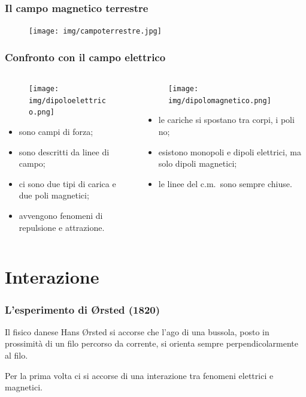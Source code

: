 \documentclass[]{beamer}
\theoremstyle{plain}
\begin{document}
\begin{frame}
\frametitle{Il campo magnetico terrestre}
\begin{figure}
\texttt{[image: img/campoterrestre.jpg]}
\end{figure}
\end{frame}



\begin{frame}
\frametitle{Confronto con il campo elettrico}
\begin{columns}
\begin{column}{0.5\textwidth}
\begin{figure}
\texttt{[image: img/dipoloelettrico.png]}
\end{figure}
\begin{itemize}
  \item<2-> \alert<2>{sono campi di forza};
  \item<3-> \alert<3>{sono descritti da linee di campo};
  \item<4-> \alert<4>{ci sono due tipi di carica e due poli magnetici};
  \item<5-> \alert<5>{avvengono fenomeni di repulsione e attrazione}.
\end{itemize}
\end{column}
\begin{column}{0.5\textwidth}
\begin{figure}
\texttt{[image: img/dipolomagnetico.png]}
\end{figure}
\begin{itemize}
  \item<6-> \alert<6>{le cariche si spostano tra corpi, i poli no};
  \item<7-> \alert<7>{esistono monopoli e dipoli elettrici, ma solo dipoli magnetici};
  \item<8-> \alert<8>{le linee del c.m.~sono sempre chiuse}.
\end{itemize}
\end{column}
\end{columns}
\end{frame}

\section{Interazione}

\begin{frame}
\frametitle{L'esperimento di {\O}rsted (1820)}
Il fisico danese Hans {\O}rsted si accorse che l'ago di una bussola, posto in prossimità di un filo percorso da corrente, \alert<1>{si orienta sempre perpendicolarmente al filo}.\pause

\pause
 
Per la prima volta ci si accorse di una \alert{interazione tra fenomeni elettrici e magnetici}.
\end{frame}
\end{document}
